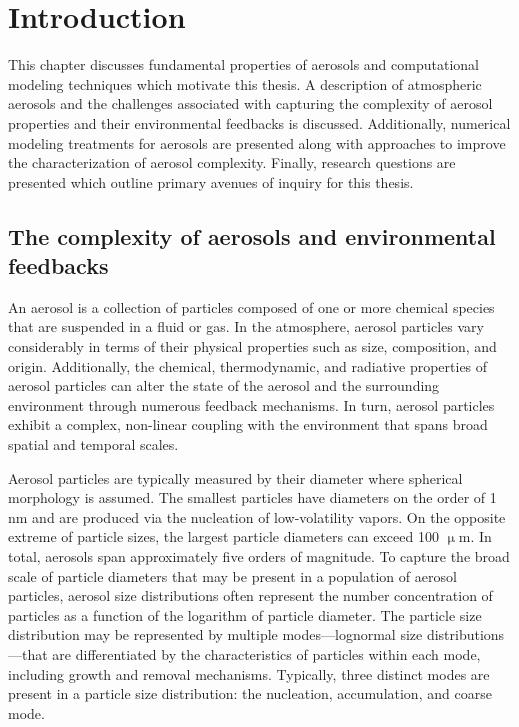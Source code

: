 \chapter{Introduction}

This chapter discusses fundamental properties of aerosols and computational modeling techniques which motivate this thesis. A description of atmospheric aerosols and the challenges associated with capturing the complexity of aerosol properties and their environmental feedbacks is discussed. Additionally, numerical modeling treatments for aerosols are presented along with approaches to improve the characterization of aerosol complexity. Finally, research questions are presented which outline primary avenues of inquiry for this thesis.  

\section{The complexity of aerosols and environmental feedbacks}\label{aerosol_properties}

An aerosol is a collection of particles composed of one or more chemical species that are suspended in a fluid or gas. In the atmosphere, aerosol particles vary considerably in terms of their physical properties such as size, composition, and origin. Additionally, the chemical, thermodynamic, and radiative properties of aerosol particles can alter the state of the aerosol and the surrounding environment through numerous feedback mechanisms. In turn, aerosol particles exhibit a complex, non-linear coupling with the environment that spans broad spatial and temporal scales.

Aerosol particles are typically measured by their diameter where spherical morphology is assumed. The smallest particles have diameters on the order of 1 nm and are produced via the nucleation of low-volatility vapors. On the opposite extreme of particle sizes, the largest particle diameters can exceed 100 $\upmu$m. In total, aerosols span approximately five orders of magnitude. To capture the broad scale of particle diameters that may be present in a population of aerosol particles, aerosol size distributions often represent the number concentration of particles as a function of the logarithm of particle diameter. The particle size distribution may be represented by multiple modes---lognormal size distributions---that are differentiated by the characteristics of particles within each mode, including growth and removal mechanisms. Typically, three distinct modes are present in a particle size distribution: the nucleation, accumulation, and coarse mode. 

